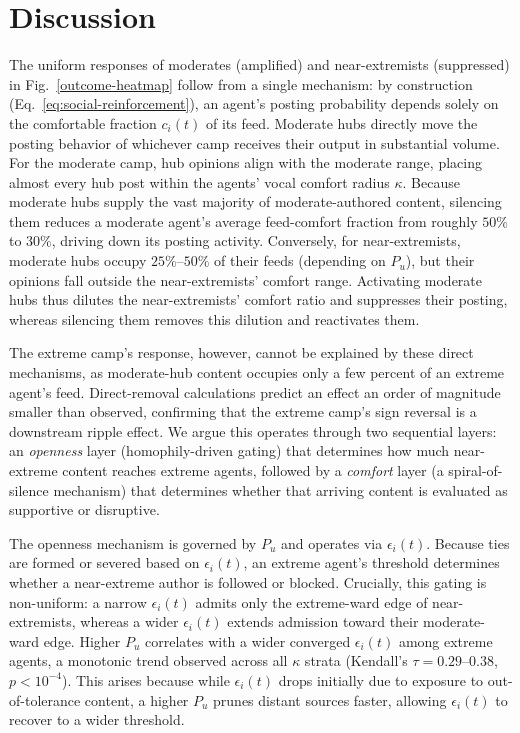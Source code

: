 \documentclass{svproc}
\def\BoundedConfidence{\epsilon} %
\def\VCR{\kappa}                 %
\begin{document}
\section{Discussion}\label{sec:discussion}
The uniform responses of moderates (amplified) and near-extremists
(suppressed) in Fig.~\ref{outcome-heatmap} follow from a single
mechanism: by construction (Eq.~\eqref{eq:social-reinforcement}), an
agent's posting probability depends solely on the comfortable fraction
$c_i(t)$ of its feed. Moderate hubs directly move the posting behavior
of whichever camp receives their output in substantial volume. For the
moderate camp, hub opinions align with the moderate range, placing
almost every hub post within the agents' vocal comfort radius
$\VCR$. Because moderate hubs supply the vast majority of
moderate-authored content, silencing them reduces a moderate agent's
average feed-comfort fraction from roughly $50\%$ to $30\%$, driving
down its posting activity. Conversely, for near-extremists, moderate
hubs occupy $25\%\text{--}50\%$ of their feeds (depending on $P_u$),
but their opinions fall outside the near-extremists' comfort
range. Activating moderate hubs thus dilutes the near-extremists'
comfort ratio and suppresses their posting, whereas silencing them
removes this dilution and reactivates them.
\par


The extreme camp's response, however, cannot be explained by these
direct mechanisms, as moderate-hub content occupies only a few percent
of an extreme agent's feed. Direct-removal calculations predict an
effect an order of magnitude smaller than observed, confirming that
the extreme camp's sign reversal is a downstream ripple effect. We
argue this operates through two sequential layers: an \emph{openness}
layer (homophily-driven gating) that determines how much near-extreme
content reaches extreme agents, followed by a \emph{comfort} layer (a
spiral-of-silence mechanism) that determines whether that arriving
content is evaluated as supportive or disruptive.
\par


The openness mechanism is governed by $P_u$ and operates via
$\BoundedConfidence_i(t)$. Because ties are formed or severed based on
$\BoundedConfidence_i(t)$, an extreme agent's threshold determines
whether a near-extreme author is followed or blocked. Crucially, this
gating is non-uniform: a narrow $\BoundedConfidence_i(t)$ admits only
the extreme-ward edge of near-extremists, whereas a wider
$\BoundedConfidence_i(t)$ extends admission toward their moderate-ward
edge. Higher $P_u$ correlates with a wider converged
$\BoundedConfidence_i(t)$ among extreme agents, a monotonic trend
observed across all $\VCR$ strata (Kendall's $\tau=0.29\text{--}0.38$,
$p<10^{-4}$). This arises because while $\BoundedConfidence_i(t)$
drops initially due to exposure to out-of-tolerance content, a higher
$P_u$ prunes distant sources faster, allowing
$\BoundedConfidence_i(t)$ to recover to a wider threshold.
\par
\end{document}
